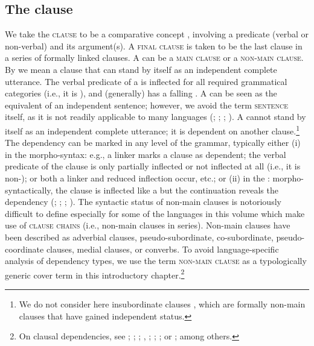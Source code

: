 \documentclass[output=paper]{LSP/langsci}
\begin{document}
\subsection{The clause}
\label{GuAi1.2clause}
We take the \textsc{clause} to be a comparative concept \citep[following][672]{haspelmath10}, involving a predicate (verbal or non-verbal) and its argument(s). A \textsc{final clause} is taken to be the last clause in a series of formally linked clauses. A  can be a \textsc{main clause} or a \textsc{non-main clause}. By  we mean a clause that can stand by itself as an independent complete utterance. The verbal predicate of a  is inflected for all required grammatical categories (i.e., it is ), and (generally) has a falling  \citep{fitzpatrick.2000}. A  can be seen as the equivalent of an independent sentence; however, we avoid the term \textsc{sentence} itself, as it is not readily applicable to many languages (\citealt[][132--133]{dixon10}; \citealt{Longacre1970}; \citealt{Miller1995}; \citealt{Mithun2005}). A  cannot stand by itself as an independent complete utterance; it is dependent on another clause.\footnote{We do not consider here insubordinate clauses \citep{evans07}, which are formally non-main clauses that have gained independent status.} The dependency can be marked in any  level of the grammar, typically either (i) in the morpho-syntax: e.g., a linker marks a clause as dependent; the verbal predicate of the clause is only partially inflected or not inflected at all (i.e., it is non-); or both a linker and reduced inflection occur, etc.; or (ii) in the : morpho-syntactically, the clause is inflected like a  but the continuation  reveals the dependency (\citealt{bolinger.1984}; \citealt[][9--10]{chafe88}; \citealt[][23--24, 31]{genetti04}; \citealt{Mithun2009}). The syntactic status of non-main clauses is notoriously difficult to define especially for some of the languages in this volume which make use of \textsc{clause chains} (i.e., non-main clauses in series). Non-main clauses have been described as adverbial clauses, pseudo-subordinate, co-subordinate, pseudo-coordinate clauses, medial clauses, or converbs. To avoid language-specific analysis of dependency types, we use the term \textsc{non-main clause} as a typologically generic cover term in this introductory chapter.\footnote{On clausal dependencies, see \citealt{cristofaro05};  \citealt{culicover.1997};  \citealt{haiman.1984}; \citealt{Haspelmath.1995}, \citealt{haspelmath2004}; \citealt[][398--417]{longacre07}; \citealt{valin84}; or  \citealt{Yuasa02}; among others.}
\end{document}
